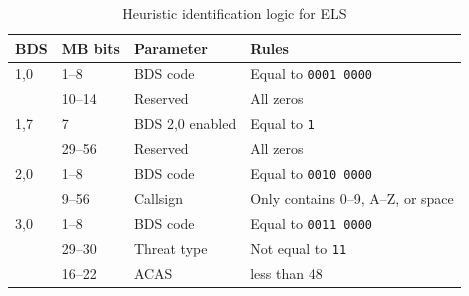 \begin{table}
\centering
\small
\caption{Heuristic identification logic for ELS}
\label{tb:bds_rule_els}
\begin{tabular}{|l|l|l|l|}
\hline
\textbf{BDS} & \textbf{MB bits} & \textbf{Parameter} & \textbf{Rules} \\ \hline \hline
1,0 & 1--8 & BDS code & Equal to \texttt{0001 0000}  \\ \cline{2-4} 
 & 10--14 & Reserved & All zeros \\ \hline \hline
1,7 & 7 & BDS 2,0 enabled & Equal to \texttt{1} \\ \cline{2-4} 
 & 29--56 & Reserved & All zeros \\ \hline \hline
2,0 & 1--8 & BDS code & Equal to \texttt{0010 0000} \\ \cline{2-4} 
 & 9--56 & Callsign & Only contains 0--9, A--Z, or space \\ \hline \hline
3,0 & 1--8 & BDS code & Equal to \texttt{0011 0000} \\ \cline{2-4} 
 & 29--30 & Threat type & Not equal to \texttt{11} \\ \cline{2-4} 
 & 16--22 & ACAS &  less than 48 \\ \hline

\end{tabular}
\end{table}



